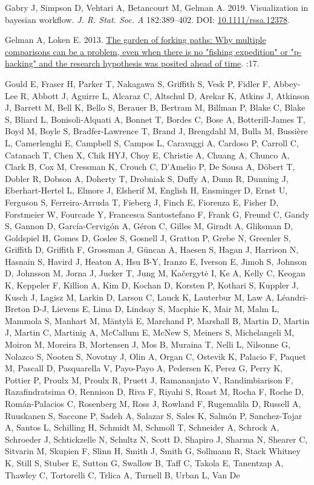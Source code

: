 \documentclass[10pt,a4paper]{article}
\newlength{\cslhangindent}
\newlength{\cslentryspacingunit} %
\newenvironment{CSLReferences}[2] %
 {%
  \setlength{\parindent}{0pt}
  \ifodd #1
  \let\oldpar\par
  \def\par{\hangindent=\cslhangindent\oldpar}
  \fi
  \setlength{\parskip}{#2\cslentryspacingunit}
 }%
 {}
\begin{document}
\begin{CSLReferences}{1}{0}
Gabry J, Simpson D, Vehtari A, Betancourt M, Gelman A. 2019. Visualization in bayesian workflow. \emph{J. R. Stat. Soc. A} 182:389--402. DOI: \href{https://doi.org/10.1111/rssa.12378}{10.1111/rssa.12378}.

Gelman A, Loken E. 2013. \href{http://www.stat.columbia.edu/~gelman/research/unpublished/p_hacking.pdf}{The garden of forking paths: {Why} multiple comparisons can be a problem, even when there is no "fishing expedition" or "p-hacking" and the research hypothesis was posited ahead of time}. :17.

Gould E, Fraser H, Parker T, Nakagawa S, Griffith S, Vesk P, Fidler F, Abbey-Lee R, Abbott J, Aguirre L, Alcaraz C, Altschul D, Arekar K, Atkins J, Atkinson J, Barrett M, Bell K, Bello S, Berauer B, Bertram M, Billman P, Blake C, Blake S, Bliard L, Bonisoli-Alquati A, Bonnet T, Bordes C, Bose A, Botterill-James T, Boyd M, Boyle S, Bradfer-Lawrence T, Brand J, Brengdahl M, Bulla M, Bussière L, Camerlenghi E, Campbell S, Campos L, Caravaggi A, Cardoso P, Carroll C, Catanach T, Chen X, Chik HYJ, Choy E, Christie A, Chuang A, Chunco A, Clark B, Cox M, Cressman K, Crouch C, D'Amelio P, De Sousa A, Döbert T, Dobler R, Dobson A, Doherty T, Drobniak S, Duffy A, Dunn R, Dunning J, Eberhart-Hertel L, Elmore J, Elsherif M, English H, Ensminger D, Ernst U, Ferguson S, Ferreira-Arruda T, Fieberg J, Finch E, Fiorenza E, Fisher D, Forstmeier W, Fourcade Y, Francesca Santostefano F, Frank G, Freund C, Gandy S, Gannon D, García-Cervigón A, Géron C, Gilles M, Girndt A, Gliksman D, Goldspiel H, Gomes D, Goslee S, Gosnell J, Gratton P, Grebe N, Greenler S, Griffith D, Griffith F, Grossman J, Güncan A, Haesen S, Hagan J, Harrison N, Hasnain S, Havird J, Heaton A, Hsu B-Y, Iranzo E, Iverson E, Jimoh S, Johnson D, Johnsson M, Jorna J, Jucker T, Jung M, Kačergytė I, Ke A, Kelly C, Keogan K, Keppeler F, Killion A, Kim D, Kochan D, Korsten P, Kothari S, Kuppler J, Kusch J, Lagisz M, Larkin D, Larson C, Lauck K, Lauterbur M, Law A, Léandri-Breton D-J, Lievens E, Lima D, Lindsay S, Macphie K, Mair M, Malm L, Mammola S, Manhart M, Mäntylä E, Marchand P, Marshall B, Martin D, Martin J, Martin C, Martinig A, McCallum E, McNew S, Meiners S, Michelangeli M, Moiron M, Moreira B, Mortensen J, Mos B, Muraina T, Nelli L, Nilsonne G, Nolazco S, Nooten S, Novotny J, Olin A, Organ C, Ostevik K, Palacio F, Paquet M, Pascall D, Pasquarella V, Payo-Payo A, Pedersen K, Perez G, Perry K, Pottier P, Proulx M, Proulx R, Pruett J, Ramananjato V, Randimbiarison F, Razafindratsima O, Rennison D, Riva F, Riyahi S, Roast M, Rocha F, Roche D, Román-Palacios C, Rosenberg M, Ross J, Rowland F, Rugemalila D, Russell A, Ruuskanen S, Saccone P, Sadeh A, Salazar S, Sales K, Salmón P, Sanchez-Tojar A, Santos L, Schilling H, Schmidt M, Schmoll T, Schneider A, Schrock A, Schroeder J, Schtickzelle N, Schultz N, Scott D, Shapiro J, Sharma N, Shearer C, Sitvarin M, Skupien F, Slinn H, Smith J, Smith G, Sollmann R, Stack Whitney K, Still S, Stuber E, Sutton G, Swallow B, Taff C, Takola E, Tanentzap A, Thawley C, Tortorelli C, Trlica A, Turnell B, Urban L, Van De 
\end{CSLReferences}
\end{document}
